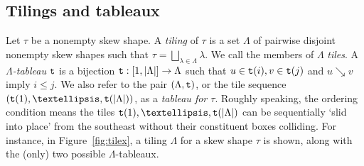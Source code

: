 \documentclass[Unicode,ALCO]{cedram}
\newcommand{\0}{{\bar 0}}
\newcommand{\ttt}{{\tt t}}
\begin{document}
\subsection{Tilings and tableaux}\label{tilingsec}
Let \(\tau\) be a nonempty skew shape. A {\em tiling} of \(\tau\) is a set \(\Lambda\) of pairwise disjoint nonempty skew shapes such that \(\tau = \bigsqcup_{\lambda \in \Lambda} \lambda\). We call the members of \(\Lambda\) {\em tiles}.
A {\em \(\Lambda\)-tableau} \(\ttt\) is a bijection \(\ttt: [1, |\Lambda|] \to \Lambda\) such that \(u \in \ttt(i), v \in \ttt(j)\) and \(u \searrow v\) imply \(i\leq j\). We also refer to the pair \((\Lambda, \ttt)\), or the tile sequence \((\ttt(1), \ldots, \ttt(|\Lambda|))\), as a {\em tableau for \(\tau\)}.
Roughly speaking, the ordering condition means the tiles \(\ttt(1), \ldots, \ttt(|\Lambda|)\) can be sequentially `slid into place' from the southeast without their constituent boxes colliding. For instance, in Figure~\ref{fig:tilex}, a tiling \(\Lambda\) for a skew shape \(\tau\) is shown, along with the (only) two possible \(\Lambda\)-tableaux. 
\end{document}
